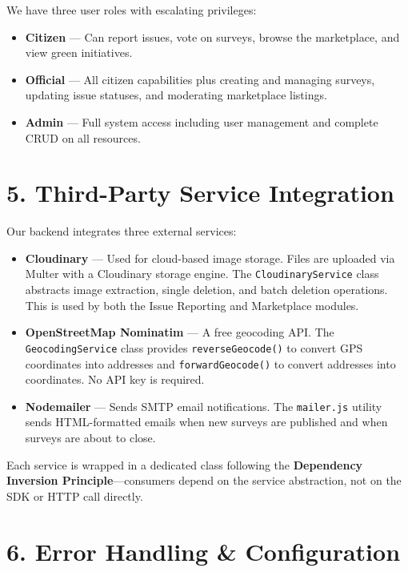 \documentclass[12pt,a4paper]{article}
\begin{document}
We have three user roles with escalating privileges:

\begin{itemize}[nosep]
    \item \textbf{Citizen} --- Can report issues, vote on surveys, browse the marketplace, and view green initiatives.
    \item \textbf{Official} --- All citizen capabilities plus creating and managing surveys, updating issue statuses, and moderating marketplace listings.
    \item \textbf{Admin} --- Full system access including user management and complete CRUD on all resources.
\end{itemize}

\section{5. Third-Party Service Integration}

Our backend integrates three external services:

\begin{itemize}[nosep]
    \item \textbf{Cloudinary} --- Used for cloud-based image storage. Files are uploaded via Multer with a Cloudinary storage engine. The \texttt{CloudinaryService} class abstracts image extraction, single deletion, and batch deletion operations. This is used by both the Issue Reporting and Marketplace modules.
    \item \textbf{OpenStreetMap Nominatim} --- A free geocoding API. The \texttt{GeocodingService} class provides \texttt{reverseGeocode()} to convert GPS coordinates into addresses and \texttt{forwardGeocode()} to convert addresses into coordinates. No API key is required.
    \item \textbf{Nodemailer} --- Sends SMTP email notifications. The \texttt{mailer.js} utility sends HTML-formatted emails when new surveys are published and when surveys are about to close.
\end{itemize}

Each service is wrapped in a dedicated class following the \textbf{Dependency Inversion Principle}---consumers depend on the service abstraction, not on the SDK or HTTP call directly.

\section{6. Error Handling \& Configuration}
\end{document}
